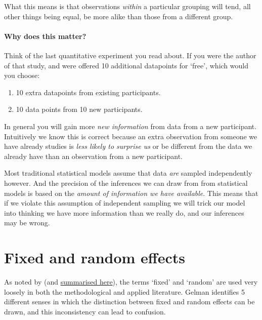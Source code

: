 \documentclass[]{article}
\providecommand{\tightlist}{%
  \setlength{\itemsep}{0pt}\setlength{\parskip}{0pt}}
\let\oldparagraph\paragraph
\renewcommand{\paragraph}[1]{\oldparagraph{#1}\mbox{}}
\begin{document}
What this means is that observations \emph{within} a particular grouping will tend,
all other things being equal, be more alike than those from a different group.

\hypertarget{why-does-this-matter}{%
\paragraph{Why does this matter?}\label{why-does-this-matter}}

Think of the last quantitative experiment you read about. If you were the author
of that study, and were offered 10 additional datapoints for `free', which would
you choose:

\begin{enumerate}
\def\labelenumi{\arabic{enumi}.}
\tightlist
\item
  10 extra datapoints from existing participants.
\item
  10 data points from 10 new participants.
\end{enumerate}

In general you will gain more \emph{new information} from data from a new
participant. Intuitively we know this is correct because an extra observation
from someone we have already studies is \emph{less likely to surprise us} or be
different from the data we already have than an observation from a new
participant.

Most traditional statistical models assume that data \emph{are} sampled independently
however. And the precision of the inferences we can draw from from statistical
models is based on the \emph{amount of information we have available}. This means
that if we violate this assumption of independent sampling we will trick our
model into thinking we have more information than we really do, and our
inferences may be wrong.

\hypertarget{fixed-or-random}{%
\section{Fixed and random effects}\label{fixed-or-random}}

As noted by \citet{gelman_analysis_2005} (and
\href{http://andrewgelman.com/2005/01/25/why_i_dont_use/}{summarised here}), the
terms `fixed' and `random' are used very loosely in both the methodological and
applied literature. Gelman identifies 5 different senses in which the
distinction between fixed and random effects can be drawn, and this
inconsistency can lead to confusion.
\end{document}
